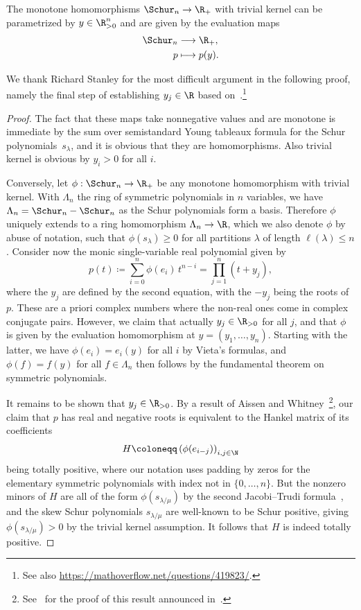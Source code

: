 \begin{prop}
	\label{real_schur}
	The monotone homomorphisms $\Schur_n \to \R_+$ with trivial kernel can be parametrized by $y \in \R^n_{>0}$ and are given by the evaluation maps
	\begin{align*}
		\Schur_n & \longrightarrow \R_+, \\
		p & \longmapsto p(y).
	\end{align*}
\end{prop}

We thank Richard Stanley for the most difficult argument in the following proof, namely the final step of establishing $y_j \in \R$ based on~\cite{totallypositive}.\footnote{See also \url{https://mathoverflow.net/questions/419823/}.}

\begin{proof}
	The fact that these maps take nonnegative values and are monotone is immediate by the sum over semistandard Young tableaux formula for the Schur polynomials~$s_\lambda$, and it is obvious that they are homomorphisms. Also trivial kernel is obvious by $y_i > 0$ for all $i$.

	Conversely, let $\phi : \Schur_n \to \R_+$ be any monotone homomorphism with trivial kernel.
	With $\Lambda_n$ the ring of symmetric polynomials in $n$ variables, we have $\Lambda_n = \Schur_n - \Schur_n$ as the Schur polynomials form a basis.
	Therefore $\phi$ uniquely extends to a ring homomorphism $\Lambda_n \to \R$, which we also denote $\phi$ by abuse of notation, such that $\phi(s_\lambda) \ge 0$ for all partitions $\lambda$ of length $\ell(\lambda) \le n$.
	Consider now the monic single-variable real polynomial given by
	\[
		p(t) \coloneqq \sum_{i=0}^n \phi(e_i) \, t^{n-i} = \prod_{j=1}^n (t + y_j),
	\]
	where the $y_j$ are defined by the second equation, with the $-y_j$ being the roots of~$p$.
	These are a priori complex numbers where the non-real ones come in complex conjugate pairs.
	However, we claim that actually $y_j \in \R_{>0}$ for all $j$, and that $\phi$ is given by the evaluation homomorphism at $y = (y_1,\ldots,y_n)$.
	Starting with the latter, we have $\phi(e_i) = e_i(y)$ for all $i$ by Vieta's formulas, and $\phi(f) = f(y)$ for all $f \in \Lambda_n$ then follows by the fundamental theorem on symmetric polynomials.

	It remains to be shown that $y_j \in \R_{>0}$.
	By a result of Aissen and Whitney~\cite[6.]{totallypositive}\footnote{See~\cite{totallypositiveI} for the proof of this result announced in~\cite{totallypositive}.}, our claim that $p$ has real and negative roots is equivalent to the Hankel matrix of its coefficients
	\[
		H \coloneqq \left( \phi(e_{i-j}) \right)_{i,j \in \N}
	\]
	being totally positive, where our notation uses padding by zeros for the elementary symmetric polynomials with index not in $\{0,\ldots,n\}$.
	But the nonzero minors of $H$ are all of the form $\phi(s_{\lambda / \mu})$ by the second Jacobi--Trudi formula~\cite[Corollary~7.16.2]{stanley2}, and the skew Schur polynomials $s_{\lambda / \mu}$ are well-known to be Schur positive, giving $\phi(s_{\lambda / \mu}) > 0$ by the trivial kernel assumption. It follows that $H$ is indeed totally positive.
\end{proof}

